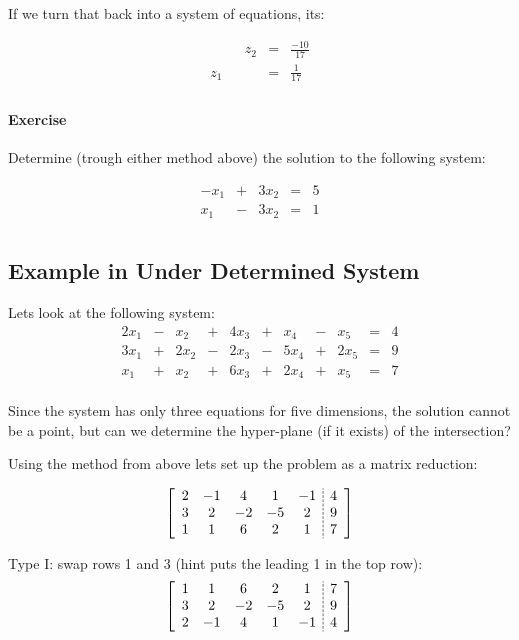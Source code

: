 If we turn that back into a system of equations, its: 

\[\begin{array}{rcrcr}
 & & z_2 & = & \frac{-10}{17}\\
 z_1 & &  & = & \frac{1}{17}\\
\end{array}\]



\paragraph{Exercise} Determine (trough either method above) the solution to the following system: 

\[\begin{array}{rcrcr}
-x_1 & +  & 3 x_2 & = & 5\\
x_1 & -  &  3x_2 & = & 1\\
\end{array}\]

\subsection{Example in Under Determined System}
Lets look at the following system: 
\[\begin{array}{rcrcrcrcrcr}
2x_1 & - & x_2 & + & 4x_3 & + & x_4 & - & x_5 & = & 4\\
3x_1 & + & 2x_2 & - & 2x_3 & - & 5x_4 & + & 2x_5 & = & 9\\
x_1 & + & x_2 & + & 6x_3 & + & 2x_4 & + & x_5 & = & 7\\
\end{array}\]

Since the system has only three equations for five dimensions, the solution cannot be a point,
but can we determine the hyper-plane (if it exists) of the intersection? 

Using the method from above lets set up the problem as a matrix reduction: 

\[\left[\begin{array}{ccccc;{2pt/1pt}c} 
2 & -1 & 4 & 1 & -1 & 4\\
3 & 2 & -2 & -5 &  2 & 9\\
1 & 1 & 6 & 2 &  1 & 7\\
\end{array}\right]\]

Type I: swap rows 1 and 3 (hint puts the leading 1 in the top row):
\[\left[\begin{array}{ccccc;{2pt/1pt}c} 
1 & 1 & 6 & 2 &  1 & 7\\
3 & 2 & -2 & -5 &  2 & 9\\
2 & -1 & 4 & 1 & -1 & 4\\
\end{array}\right]\]

